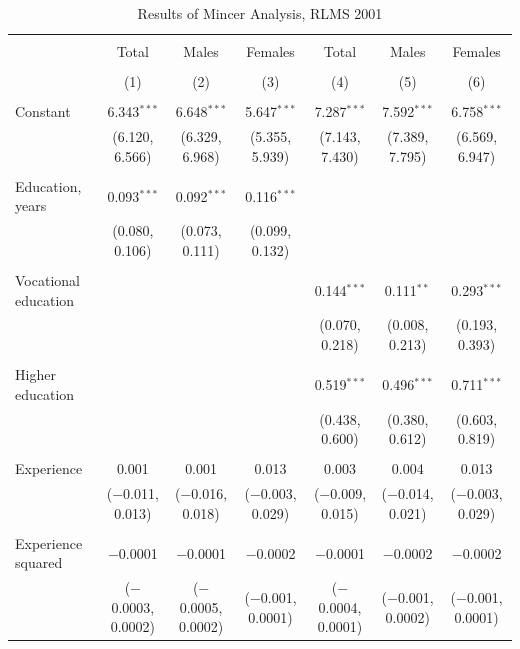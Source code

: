 \documentclass[alpha-refs]{wiley-article-01g}
\begin{document}
\begin{landscape}
	
	\fontsize{9}{11}
	\selectfont
	
	\begin{table}[!htbp] \centering 
\renewcommand{\arraystretch}{1.0}
		\caption{Results of Mincer Analysis, RLMS 2001} 
		\label{} 
		\begin{tabular}{@{\extracolsep{5pt}}lcccccc} 
			\\[-.8ex]\hline 
			\hline \\[-.8ex] 
			& Total & Males & Females & Total & Males & Females \\ 
			\\[-.8ex] & (1) & (2) & (3) & (4) & (5) & (6)\\ 
			\hline \\[-.8ex] 
			Constant & 6.343$^{***}$ & 6.648$^{***}$ & 5.647$^{***}$ & 7.287$^{***}$ & 7.592$^{***}$ & 6.758$^{***}$ \\ 
			& (6.120, 6.566) & (6.329, 6.968) & (5.355, 5.939) & (7.143, 7.430) & (7.389, 7.795) & (6.569, 6.947) \\ 
			& & & & & & \\ 
			Education, years & 0.093$^{***}$ & 0.092$^{***}$ & 0.116$^{***}$ &  &  &  \\ 
			& (0.080, 0.106) & (0.073, 0.111) & (0.099, 0.132) &  &  &  \\ 
			& & & & & & \\ 
			Vocational education &  &  &  & 0.144$^{***}$ & 0.111$^{**}$ & 0.293$^{***}$ \\ 
			&  &  &  & (0.070, 0.218) & (0.008, 0.213) & (0.193, 0.393) \\ 
			& & & & & & \\ 
			Higher education &  &  &  & 0.519$^{***}$ & 0.496$^{***}$ & 0.711$^{***}$ \\ 
			&  &  &  & (0.438, 0.600) & (0.380, 0.612) & (0.603, 0.819) \\ 
			& & & & & & \\ 
			Experience & 0.001 & 0.001 & 0.013 & 0.003 & 0.004 & 0.013 \\ 
			& ($-$0.011, 0.013) & ($-$0.016, 0.018) & ($-$0.003, 0.029) & ($-$0.009, 0.015) & ($-$0.014, 0.021) & ($-$0.003, 0.029) \\ 
			& & & & & & \\ 
			Experience squared & $-$0.0001 & $-$0.0001 & $-$0.0002 & $-$0.0001 & $-$0.0002 & $-$0.0002 \\ 
			& ($-$0.0003, 0.0002) & ($-$0.0005, 0.0002) & ($-$0.001, 0.0001) & ($-$0.0004, 0.0001) & ($-$0.001, 0.0002) & ($-$0.001, 0.0001) \\ 

\end{tabular}
\end{table}
\end{landscape}
\end{document}

